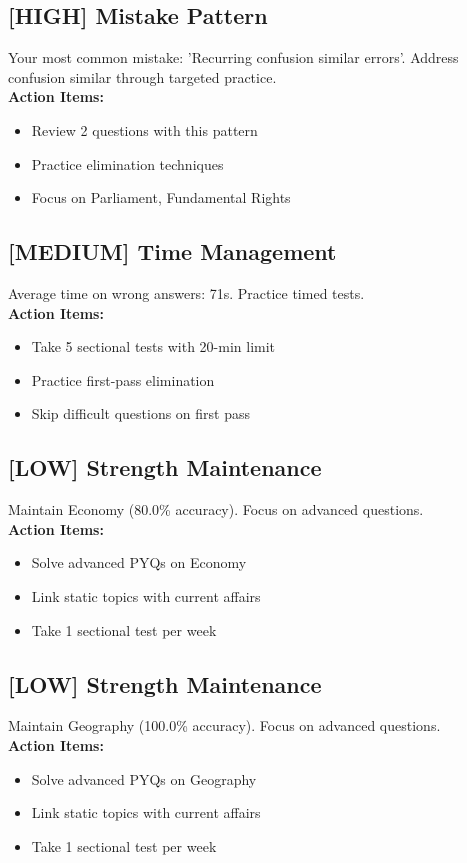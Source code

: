 \documentclass[a4paper,12pt]{article}
\begin{document}
\subsection*{[HIGH] Mistake Pattern}
Your most common mistake: 'Recurring confusion similar errors'. Address confusion similar through targeted practice.\\
\textbf{Action Items:}
\begin{itemize}
\item Review 2 questions with this pattern
\item Practice elimination techniques
\item Focus on Parliament, Fundamental Rights
\end{itemize}
\subsection*{[MEDIUM] Time Management}
Average time on wrong answers: 71s. Practice timed tests.\\
\textbf{Action Items:}
\begin{itemize}
\item Take 5 sectional tests with 20-min limit
\item Practice first-pass elimination
\item Skip difficult questions on first pass
\end{itemize}
\subsection*{[LOW] Strength Maintenance}
Maintain Economy (80.0\% accuracy). Focus on advanced questions.\\
\textbf{Action Items:}
\begin{itemize}
\item Solve advanced PYQs on Economy
\item Link static topics with current affairs
\item Take 1 sectional test per week
\end{itemize}
\subsection*{[LOW] Strength Maintenance}
Maintain Geography (100.0\% accuracy). Focus on advanced questions.\\
\textbf{Action Items:}
\begin{itemize}
\item Solve advanced PYQs on Geography
\item Link static topics with current affairs
\item Take 1 sectional test per week
\end{itemize}
\end{document}
